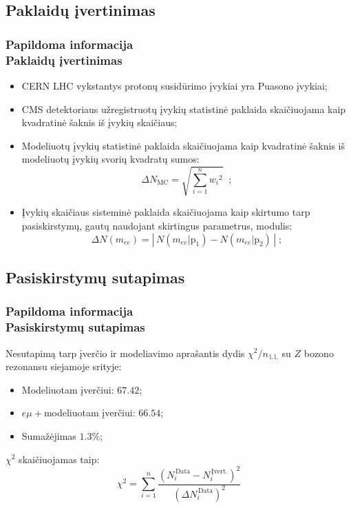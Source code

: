 \documentclass[xcolor=dvipsnames]{beamer}
\newcommand{\emu}{\mathit{e}\mu}
\newcommand{\ee}{\mathit{ee}}
\begin{document}
\begin{frame}
\subsection{Paklaidų įvertinimas}
\frametitle{Papildoma informacija\\ \small Paklaidų įvertinimas}
\begin{itemize}
\item CERN LHC vykstantys protonų susidūrimo įvykiai yra Puasono įvykiai;
\item CMS detektoriaus užregistruotų įvykių statistinė paklaida skaičiuojama kaip kvadratinė šaknis iš įvykių skaičiaus;
\item Modeliuotų įvykių statistinė paklaida skaičiuojama kaip kvadratinė šaknis iš modeliuotų įvykių svorių kvadratų sumos:
\begin{equation*}
\Delta \mathit{N}_\mathrm{MC} = \sqrt{\sum_{\mathit{i}=1}^{\mathit{n}}\mathit{w_{i}}^{2}} \;\; ;
\end{equation*}
\item Įvykių skaičiaus sisteminė paklaida skaičiuojama kaip skirtumo tarp pasiskirstymų, gautų naudojant skirtingus parametrus, modulis:
\begin{equation*}
\Delta \mathit{N}(\mathit{m}_{\ee}) = \left| \, \mathit{N}(\mathit{m}_{\ee} | \mathrm{p}_{1}) - \mathit{N}(\mathit{m}_{\ee} | \mathrm{p}_{2}) \, \right| \; ;
\end{equation*}
\end{itemize}
\end{frame}

\begin{frame}
\subsection{Pasiskirstymų sutapimas}
\frametitle{Papildoma informacija\\ \small Pasiskirstymų sutapimas}
Nesutapimą tarp įverčio ir modeliavimo aprašantis dydis $\chi^{2}/\mathit{n}_{\mathrm{\, l. \, l.}}$ su $\mathit{Z}$ bozono rezonansu siejamoje srityje:
\begin{itemize}
\item Modeliuotam įverčiui: $67.42$;
\item $\emu +$modeliuotam įverčiui: $66.54$;
\item Sumažėjimas $1.3\%$;
\end{itemize}
\medskip
$\chi^{2}$ skaičiuojamas taip:
\begin{equation}
\chi^{2} = \sum_{\mathit{i}=1}^{\mathit{n}} \frac{ \left( \mathit{N}_{\mathit{i}}^{\,\mathrm{Data}} - \mathit{N}_{\mathit{i}}^{\,\mathrm{Įvert.}} \right) ^{2} }
{ \left( \Delta \mathit{N}_{\mathit{i}}^{\,\mathrm{Data}} \right) ^{2} }
\end{equation}
\end{frame}
\end{document}
